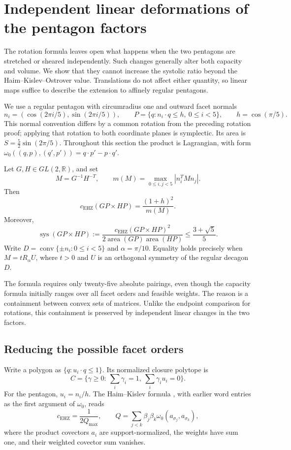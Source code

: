 \section{Independent linear deformations of the pentagon factors}
\label{sec:pentagon-affine}

The rotation formula leaves open what happens when the two pentagons are
stretched or sheared independently. Such changes generally alter both capacity
and volume. We show that they cannot increase the systolic ratio beyond the
Haim--Kislev--Ostrover value. Translations do not affect either quantity, so
linear maps suffice to describe the extension to affinely regular pentagons.

We use a regular pentagon with circumradius one and outward facet normals
\[
 n_i=(\cos(2\pi i/5),\sin(2\pi i/5)),\qquad
 P=\{q:n_i\cdot q\le h,\ 0\le i<5\},\qquad h=\cos(\pi/5).
\]
This normal convention differs by a common rotation from the preceding
rotation proof; applying that rotation to both coordinate planes is
symplectic. Its area is $S=\frac52\sin(2\pi/5)$. Throughout this section the product is
Lagrangian, with form
$\omega_0((q,p),(q',p'))=q\cdot p'-p\cdot q'$.

\begin{theorem}\label{thm:pentagon-affine-capacity}
Let $G,H\in GL(2,\mathbb R)$, and set
\[
 M=G^{-1}H^{-T},\qquad m(M)=\max_{0\le i,j<5}|n_i^TMn_j|.
\]
Then
\[
 c_{\mathrm{EHZ}}(GP\times HP)=\frac{(1+h)^2}{m(M)}.
\]
Moreover,
\[
 \operatorname{sys}(GP\times HP)
 :=\frac{c_{\mathrm{EHZ}}(GP\times HP)^2}
 {2\operatorname{area}(GP)\operatorname{area}(HP)}
 \le\frac{3+\sqrt5}{5}.
\]
Write $D=\operatorname{conv}\{\pm n_i:0\le i<5\}$ and $\alpha=\pi/10$.
Equality holds precisely when $M=tR_\alpha U$, where $t>0$ and $U$ is an
orthogonal symmetry of the regular decagon $D$.
\end{theorem}

The formula requires only twenty-five absolute pairings, even though the
capacity formula initially ranges over all facet orders and feasible weights.
The reason is a containment between convex sets of matrices. Unlike the
endpoint comparison for rotations, this containment is preserved by independent
linear changes in the two factors.

\subsection{Reducing the possible facet orders}
Write a polygon as $\{q:u_i\cdot q\le1\}$. Its normalized closure polytope is
\[
 C=\{\gamma\ge0:\ \textstyle\sum_i\gamma_i=1,\
                         \sum_i\gamma_i u_i=0\}.
\]
For the pentagon, $u_i=n_i/h$. The Haim--Kislev formula
\cite[Theorem 1.1]{HK2017}, with earlier word entries as the first argument of
$\omega_0$, reads
\[
 c_{\mathrm{EHZ}}=\frac1{2Q_{\max}},\qquad
 Q=\sum_{j<k}\beta_j\beta_k\omega_0(a_{\sigma_j},a_{\sigma_k}),
\]
where the product covectors $a_i$ are support-normalized, the weights have
sum one, and their weighted covector sum vanishes.

